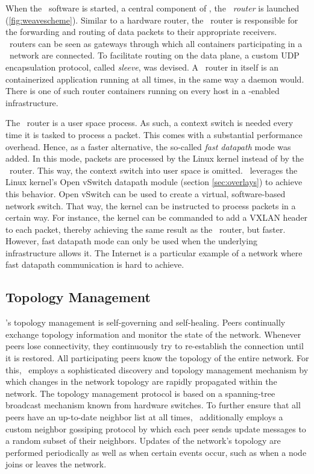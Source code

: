 When the \weave\ software is started, a central component of \wnet , the \emph{\weave\ router} is launched (\cf \autoref{fig:weavescheme}). Similar to a hardware router, the \weave\ router is responsible for the forwarding and routing of data packets to their appropriate receivers. \weave\ routers can be seen as gateways through which all containers participating in a \weave\ network are connected. To facilitate routing on the data plane, a custom UDP encapsulation protocol, called \emph{sleeve}, was devised. A \weave\ router in itself is an containerized application running at all times, in the same way a daemon would. There is one of such router containers running on every host in a \weave -enabled infrastructure.


The \weave\ router is a user space process. As such, a context switch is needed every time it is tasked to process a packet. This comes with a substantial performance overhead. Hence, as a faster alternative, the so-called \emph{fast datapath} mode was added. In this mode, packets are processed by the Linux kernel instead of by the \weave\ router. This way, the context switch into user space is omitted. \wnet\ leverages the Linux kernel's Open vSwitch datapath module (\cf section \ref{sec:overlays}) to achieve this behavior. Open vSwitch can be used to create a virtual, software-based network switch. That way, the kernel can be instructed to process packets in a certain way. For instance, the kernel can be commanded to add a VXLAN header to each packet, thereby achieving the same result as the \weave\ router, but faster. However, fast datapath mode can only be used when the underlying infrastructure allows it. The Internet is a particular example of a network where fast datapath communication is hard to achieve.


\subsection{Topology Management} 
\weave 's topology management is self-governing and self-healing. Peers continually exchange topology information and monitor the state of the network. Whenever peers lose connectivity, they continuously try to re-establish the connection until it is restored. All participating peers know the topology of the entire network. For this, \wnet\ employs a sophisticated discovery and topology management mechanism by which changes in the network topology are rapidly propagated within the network. The topology management protocol is based on a spanning-tree broadcast mechanism known from hardware switches. To further ensure that all peers have an up-to-date neighbor list at all times, \wnet\ additionally employs a custom neighbor gossiping protocol by which each peer sends update messages to a random subset of their neighbors. Updates of the network's topology are performed periodically as well as when certain events occur, such as when a node joins or leaves the network.

